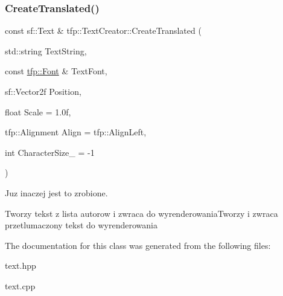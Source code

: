 \subsubsection{\texorpdfstring{Create\+Translated()}{CreateTranslated()}}
{\footnotesize\ttfamily const sf\+::\+Text \& tfp\+::\+Text\+Creator\+::\+Create\+Translated (\begin{DoxyParamCaption}\item[{std\+::string}]{Text\+String,  }\item[{const \mbox{\hyperlink{structtfp_1_1_font}{tfp\+::\+Font}} \&}]{Text\+Font,  }\item[{sf\+::\+Vector2f}]{Position,  }\item[{float}]{Scale = {\ttfamily 1.0f},  }\item[{tfp\+::\+Alignment}]{Align = {\ttfamily tfp\+:\+:AlignLeft},  }\item[{int}]{Character\+Size\+\_\+ = {\ttfamily -\/1} }\end{DoxyParamCaption})}



Juz inaczej jest to zrobione. 

Tworzy tekst z lista autorow i zwraca do wyrenderowania\+Tworzy i zwraca przetlumaczony tekst do wyrenderowania 

The documentation for this class was generated from the following files\+:\begin{DoxyCompactItemize}
\item 
text.\+hpp\item 
text.\+cpp\end{DoxyCompactItemize}
